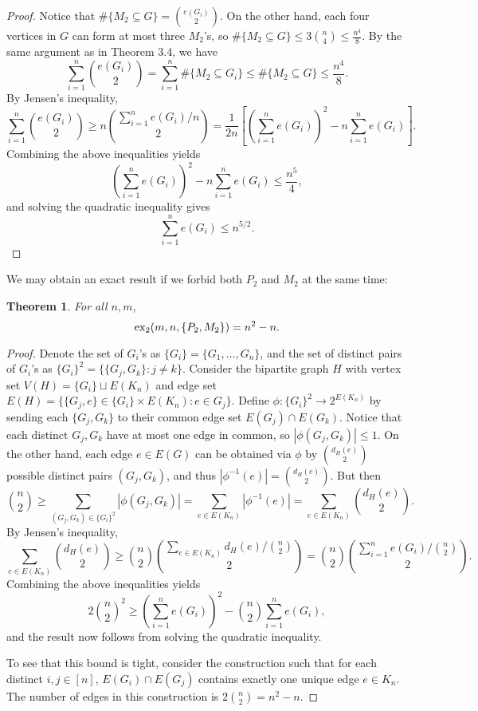 \documentclass[12pt]{report}
\newtheorem{theorem}{Theorem}[chapter]
\newcommand*{\dex}{\textnormal{ex}_2}
\begin{document}
\begin{proof}
  Notice that $\#\{M_2 \subseteq G\} = \binom{e(G_i)}{2}$. On the other hand, each four vertices in $G$ can form at most three $M_2$'s, so $\#\{M_2 \subseteq G\} \leq 3\binom{n}{4} \leq \frac{n^4}{8}$. By the same argument as in Theorem 3.4, we have 
  \[
    \sum_{i = 1}^n \binom{e(G_i)}{2} = \sum_{i = 1}^n \#\{M_2 \subseteq G_i\} \leq \#\{M_2 \subseteq G\} \leq \frac{n^4}{8}.
  \]
  By Jensen's inequality,
  \[
    \sum_{i = 1}^n \binom{e(G_i)}{2} \geq n\binom{\sum_{i = 1}^n e(G_i)/n}{2} = \frac{1}{2n}\left[\left(\sum_{i = 1}^n e(G_i)\right)^2 - n\sum_{i = 1}^n e(G_i)\right].
  \]
  Combining the above inequalities yields
  \[
    \left(\sum_{i = 1}^n e(G_i)\right)^2 - n\sum_{i = 1}^n e(G_i) \leq \frac{n^5}{4},
  \]
  and solving the quadratic inequality gives
  \[
    \sum_{i = 1}^n e(G_i) \leq n^{5/2}.
  \]
\end{proof}

We may obtain an exact result if we forbid both $P_2$ and $M_2$ at the same time:

\begin{theorem}
  For all $n, m$,
  \[
    \dex(m, n, \{P_2, M_2\}) = n^2 - n.
  \]
\end{theorem}

\begin{proof}
  Denote the set of $G_i$'s as $\{G_i\} = \{G_1, \ldots, G_n\}$, and the set of distinct pairs of $G_i$'s as $\{G_i\}^2 = \{\{G_j, G_k\} : j \neq k\}$. Consider the bipartite graph $H$ with vertex set $V(H) = \{G_i\} \sqcup E(K_n)$ and edge set $E(H) = \{\{G_j, e\} \in \{G_i\} \times E(K_n) : e \in G_j\}$. Define $\phi: \{G_i\}^2 \to 2^{E(K_n)}$ by sending each $\{G_j, G_k\}$ to their common edge set $E(G_j) \cap E(G_k)$. Notice that each distinct $G_j, G_k$ have at most one edge in common, so $|\phi(G_j, G_k)| \leq 1$. On the other hand, each edge $e \in E(G)$ can be obtained via $\phi$ by $\binom{d_H(e)}{2}$ possible distinct pairs $(G_j, G_k)$, and thus $|\phi^{-1}(e)| = \binom{d_H(e)}{2}$. But then
  \[
    \binom{n}{2} \geq \sum_{(G_j, G_k) \in \{G_i\}^2} |\phi(G_j, G_k)| = \sum_{e \in E(K_n)} |\phi^{-1}(e)| = \sum_{e \in E(K_n)} \binom{d_H(e)}{2}.
  \]
  By Jensen's inequality,
  \[
    \sum_{e \in E(K_n)} \binom{d_H(e)}{2} \geq \binom{n}{2}\binom{\sum_{e \in E(K_n)} d_H(e)/\binom{n}{2}}{2} = \binom{n}{2}\binom{\sum_{i = 1}^n e(G_i)/\binom{n}{2}}{2}.
  \]
  Combining the above inequalities yields
  \[
    2\binom{n}{2}^2 \geq \left(\sum_{i = 1}^n e(G_i)\right)^2 - \binom{n}{2}\sum_{i = 1}^n e(G_i),
  \]
  and the result now follows from solving the quadratic inequality.

  To see that this bound is tight, consider the construction such that for each distinct $i, j \in [n]$, $E(G_i) \cap E(G_j)$ contains exactly one unique edge $e \in K_n$. The number of edges in this construction is $2\binom{n}{2} = n^2 - n$.
\end{proof}
\end{document}
